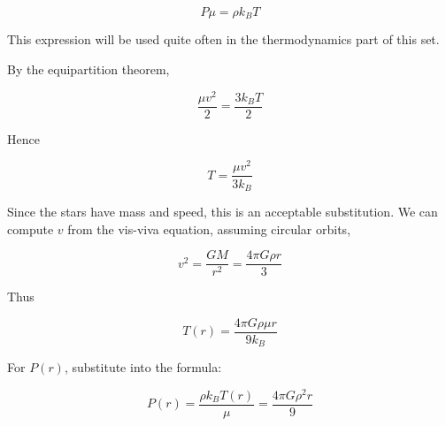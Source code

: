 \documentclass[11pt]{article}
\begin{document}
\begin{pproblem}
\begin{pssolution*}{}{}
\begin{alternativas}
        \[\boxed{P\mu = \rho k_B T}\]

        This expression will be used quite often in the thermodynamics part of this set.

        \item By the equipartition theorem,
        
        \[\frac{\mu v^2}{2} = \frac{3k_B T}{2}\]

        Hence
    
        \[T = \frac{\mu v^2}{3k_B}\]

        Since the stars have mass and speed, this is an acceptable substitution. We can compute \(v\) from the vis-viva equation, assuming circular orbits,

        \[v^2 = \frac{GM}{r^2} = \frac{4\pi G\rho r}{3}\]

        Thus

        \[\boxed{T(r) = \frac{4\pi G \rho \mu r}{9k_B}}\]

        For \(P(r)\), substitute into the formula:

        \[\boxed{P(r) = \frac{\rho k_B T(r)}{\mu} = \frac{4\pi G \rho^2 r}{9}}\]
    \end{alternativas}
    
\end{pssolution*}
\end{pproblem}
\end{document}
